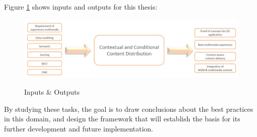 \pagebreak

Figure \ref{fig:inout} shows inputs and outputs for this thesis:

\begin{figure}[htb]
  \centering
  \includegraphics[scale=0.4]{Inp_Out.jpg}\\
  \caption{Inputs \& Outputs}
  \label{fig:inout}
\end{figure}

By studying these tasks, the goal is to draw conclusions about the best practices in this domain, and design the framework that will establish the basis for its further development and future implementation.


